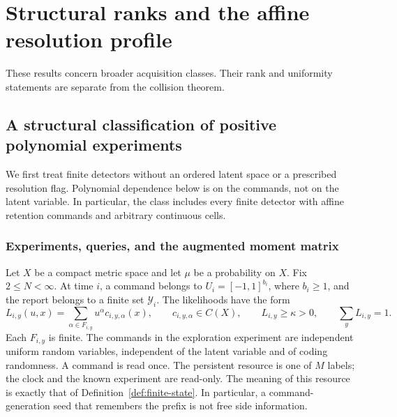 \documentclass[11pt]{amsart}
\theoremstyle{definition}\newtheorem{definition}[theorem]{Definition}
\theoremstyle{remark}\newtheorem{remark}[theorem]{Remark}
\begin{document}
\appendix
\section{Structural ranks and the affine resolution profile}
\label{app:structural}
These results concern broader acquisition classes. Their rank and
uniformity statements are separate from the collision theorem.
\begingroup
\let\section\subsection
\let\subsection\subsubsection
\let\subsubsection\paragraph
\section{A structural classification of positive polynomial experiments}
\label{sec:v18-structure}
We first treat finite detectors without an ordered latent space or a
prescribed resolution flag. Polynomial dependence below is on the commands,
not on the latent variable. In particular, the class includes every finite
detector with affine retention commands and arbitrary continuous cells.

\subsection{Experiments, queries, and the augmented moment matrix}
Let $X$ be a compact metric space and let $\mu$ be a probability on $X$.
Fix $2\le N<\infty$. At time $i$, a command belongs to
$U_i=[-1,1]^{b_i}$, where $b_i\ge1$, and the report belongs to a finite set $\mathcal Y_i$.
The likelihoods have the form
\begin{equation}\label{eq:v18-polynomial-detector}
 L_{i,y}(u,x)=\sum_{\alpha\in F_{i,y}}u^\alpha c_{i,y,\alpha}(x),
 \qquad c_{i,y,\alpha}\in C(X),\qquad
 L_{i,y}\ge\kappa>0,\qquad \sum_yL_{i,y}=1.
\end{equation}
Each $F_{i,y}$ is finite. The commands in the exploration experiment are
independent uniform random variables, independent of the latent variable
and of coding randomness. A command is read once. The persistent resource
is one of $M$ labels; the clock and the known experiment are read-only.
The meaning of this resource is exactly that of
Definition~\ref{def:finite-state}. In particular, a command-generation
seed that remembers the prefix is not free side information.
\end{document}
